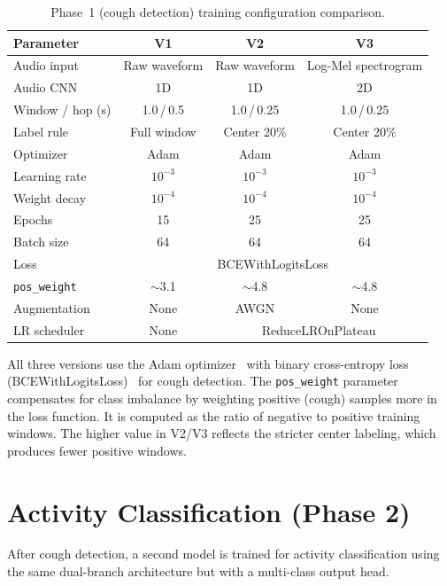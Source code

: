 \begin{table}[H]
\centering
\caption{Phase~1 (cough detection) training configuration comparison.}
\label{tab:training_config}
\small
\begin{tabular}{@{}lccc@{}}
\toprule
\textbf{Parameter} & \textbf{V1} & \textbf{V2} & \textbf{V3} \\
\midrule
Audio input & Raw waveform & Raw waveform & Log-Mel spectrogram \\
Audio CNN & 1D & 1D & 2D \\
Window / hop (s) & 1.0\,/\,0.5 & 1.0\,/\,0.25 & 1.0\,/\,0.25 \\
Label rule & Full window & Center 20\% & Center 20\% \\
Optimizer & Adam & Adam & Adam \\
Learning rate & $10^{-3}$ & $10^{-3}$ & $10^{-3}$ \\
Weight decay & $10^{-4}$ & $10^{-4}$ & $10^{-4}$ \\
Epochs & 15 & 25 & 25 \\
Batch size & 64 & 64 & 64 \\
Loss & \multicolumn{3}{c}{BCEWithLogitsLoss} \\
\texttt{pos\_weight} & $\sim$3.1 & $\sim$4.8 & $\sim$4.8 \\
Augmentation & None & AWGN & None \\
LR scheduler & None & \multicolumn{2}{c}{ReduceLROnPlateau} \\
\bottomrule
\end{tabular}
\end{table}

All three versions use the Adam optimizer~\cite{kingma2015adam} with binary cross-entropy loss (BCEWithLogitsLoss)~\cite{goodfellow2016deep} for cough detection. The \texttt{pos\_weight} parameter compensates for class imbalance by weighting positive (cough) samples more in the loss function. It is computed as the ratio of negative to positive training windows. The higher value in V2/V3 reflects the stricter center labeling, which produces fewer positive windows.

\section{Activity Classification (Phase 2)}

After cough detection, a second model is trained for activity classification using the same dual-branch architecture but with a multi-class output head.

